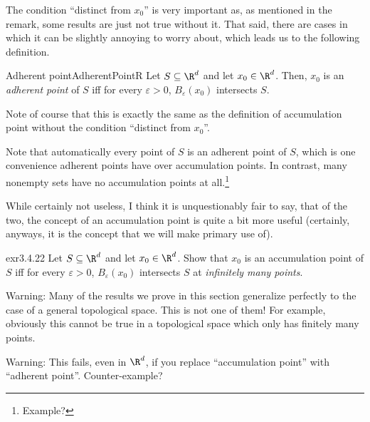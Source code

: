 The condition ``distinct from $x_0$'' is very important as, as mentioned in the remark, some results are just not true without it.  That said, there are cases in which it can be slightly annoying to worry about, which leads us to the following definition.
\begin{dfn}{Adherent point}{AdherentPointR}
Let $S\subseteq \R ^d$ and let $x_0\in \R ^d$.  Then, $x_0$ is an \emph{adherent point} of $S$ iff for every $\varepsilon >0$, $B_{\varepsilon}(x_0)$ intersects $S$.
\begin{rmk}
Note of course that this is exactly the same as the definition of accumulation point without the condition ``distinct from $x_0$''.
\end{rmk}
\begin{rmk}
Note that automatically every point of $S$ is an adherent point of $S$, which is one convenience adherent points have over accumulation points.  In contrast, many nonempty sets have no accumulation points at all.\footnote{Example?}
\end{rmk}
\begin{rmk}
While certainly not useless, I think it is unquestionably fair to say, that of the two, the concept of an accumulation point is quite a bit more useful (certainly, anyways, it is the concept that we will make primary use of).
\end{rmk}
\end{dfn}
\begin{exr}{}{exr3.4.22}
Let $S\subseteq \R ^d$ and let $x_0\in \R ^d$.  Show that $x_0$ is an accumulation point of $S$ iff for every $\varepsilon >0$, $B_\varepsilon (x_0)$ intersects $S$ at \emph{infinitely many points}.
\begin{wrn}
Warning:  Many of the results we prove in this section generalize perfectly to the case of a general topological space.  This is not one of them!  For example, obviously this cannot be true in a topological space which only has finitely many points.
\end{wrn}
\begin{wrn}
Warning:  This fails, even in $\R ^d$, if you replace ``accumulation point'' with ``adherent point''.  Counter-example?
\end{wrn}
\end{exr}
